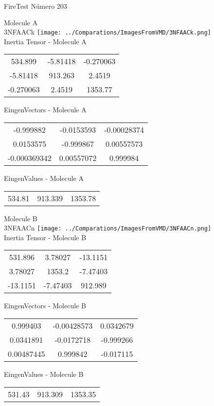 \vtab[-2cm]
\begin{center}
{\large FireTest \tab Número 203}
\end{center}
\begin{multicols}{2}
\begin{center}

Molecule A \\ 
3NFAACk
\texttt{[image: ../Comparations/ImagesFromVMD/3NFAACk.png]}
\\
Inertia Tensor - Molecule A \\
\vtab

\begin{tabular}{|c c c|}
534.899	 & 	-5.81418	 & 	-0.270063	 \\
-5.81418	 & 	913.263	 & 	2.4519	 \\
-0.270063	 & 	2.4519	 & 	1353.77
\end{tabular}

\vtab
 EingenVectors - Molecule A     \\
\vtab
\begin{tabular}{|c c c|}
-0.999882	 & 	-0.0153593	 & 	-0.00028374	 \\
0.0153575	 & 	-0.999867	 & 	0.00557573	 \\
-0.000369342	 & 	0.00557072	 & 	0.999984
\end{tabular}

\vtab
 EingenValues - Molecule A     \\
\vtab
\begin{tabular}{|c c c|}
534.81	 & 	913.339	 & 	1353.78	 \\
\end{tabular}
\columnbreak

Molecule B \\ 
3NFAACn
\texttt{[image: ../Comparations/ImagesFromVMD/3NFAACn.png]}
\\
Inertia Tensor - Molecule B \\
\vtab

\begin{tabular}{|c c c|}
531.896	 & 	3.78027	 & 	-13.1151	 \\
3.78027	 & 	1353.2	 & 	-7.47403	 \\
-13.1151	 & 	-7.47403	 & 	912.989
\end{tabular}

\vtab
 EingenVectors - Molecule B     \\
\vtab
\begin{tabular}{|c c c|}
0.999403	 & 	-0.00428573	 & 	0.0342679	 \\
0.0341891	 & 	-0.0172718	 & 	-0.999266	 \\
0.00487445	 & 	0.999842	 & 	-0.017115
\end{tabular}

\vtab
 EingenValues - Molecule B     \\
\vtab
\begin{tabular}{|c c c|}
531.43	 & 	913.309	 & 	1353.35	 \\
\end{tabular}

\end{center}
\end{multicols}

